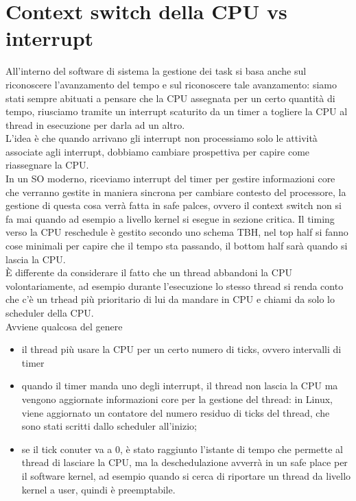\documentclass[12pt, oneside]{extbook}
\begin{document}
\section{Context switch della CPU vs interrupt}
All'interno del software di sistema la gestione dei task si basa anche sul riconoscere l'avanzamento del tempo e sul riconoscere tale avanzamento: siamo stati sempre abituati a pensare che la CPU assegnata per un certo quantità di tempo, riusciamo tramite un interrupt scaturito da un timer a togliere la CPU al thread in esecuzione per darla ad un altro.\\ L'idea è che quando arrivano gli interrupt non processiamo solo le attività associate agli interrupt, dobbiamo cambiare prospettiva per capire come riassegnare la CPU.\\In un SO moderno, riceviamo interrupt del timer per gestire informazioni core che verranno gestite in maniera sincrona per cambiare contesto del processore, la gestione di questa cosa verrà fatta in safe palces, ovvero il context switch non si fa mai quando ad esempio a livello kernel si esegue in sezione critica. Il timing verso la CPU reschedule è gestito secondo uno schema TBH, nel top half si fanno cose minimali per capire che il tempo sta passando, il bottom half sarà quando si lascia la CPU.\\È differente da considerare il fatto che un thread abbandoni la CPU volontariamente, ad esempio durante l'esecuzione lo stesso thread si renda conto che c'è un trhead più prioritario di lui da mandare in CPU e chiami da solo lo scheduler della CPU.\\Avviene qualcosa del genere
\begin{itemize}
\item il thread più usare la CPU per un certo numero di ticks, ovvero intervalli di timer
\item quando il timer manda uno degli interrupt, il thread non lascia la CPU ma vengono aggiornate informazioni core per la gestione del thread: in Linux, viene aggiornato un contatore del numero residuo di ticks del thread, che sono stati scritti dallo scheduler all'inizio;
\item se il tick conuter va a 0, è stato raggiunto l'istante di tempo che permette al thread di lasciare la CPU, ma la deschedulazione avverrà in un safe place per il software kernel, ad esempio quando si cerca di riportare un thread da livello kernel a user, quindi è preemptabile.
\end{itemize}
\end{document}
